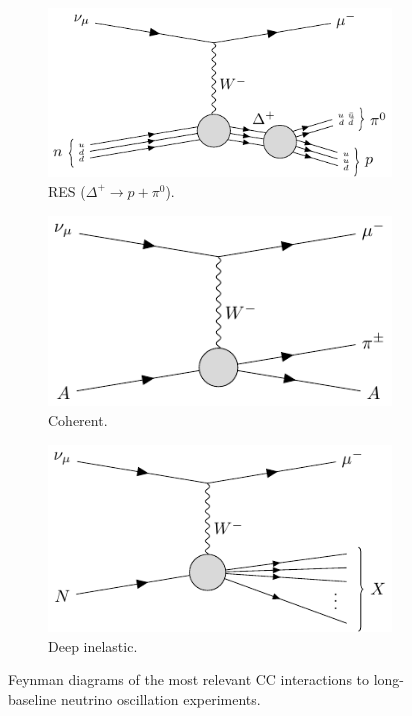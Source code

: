 \begin{figure}[t]
	\begin{subfigure}{0.5\textwidth}
		\centering
		\includegraphics[width=.90\linewidth]{Images//Nu/feynman_ccres_delta+.pdf}
		\caption{RES ($\Delta^{+} \rightarrow p + \pi^{0}$).}
	\end{subfigure}
	\begin{subfigure}{0.5\textwidth}
		\centering
		\includegraphics[width=.90\linewidth]{Images//Nu/feynman_cccoh.pdf}
		\caption{Coherent.}
	\end{subfigure}
	\begin{subfigure}{0.5\textwidth}
		\centering
		\includegraphics[width=.90\linewidth]{Images//Nu/feynman_ccdis.pdf}
		\caption{Deep inelastic.}
	\end{subfigure}
	\caption{Feynman diagrams of the most relevant CC interactions to long-baseline neutrino oscillation experiments.}
	\label{fig:neutrino_cc_interactions}
\end{figure}

